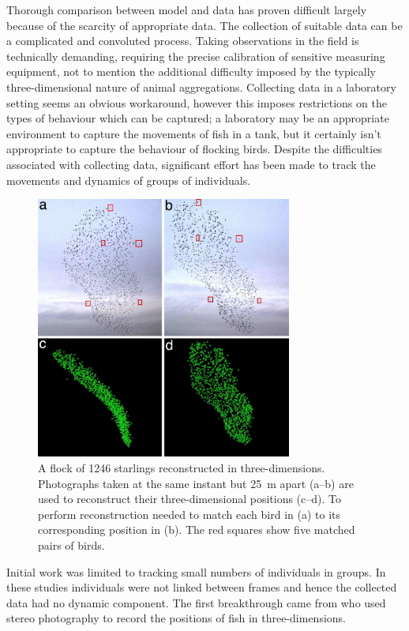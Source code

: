 Thorough comparison between model and data has proven difficult largely
because of the scarcity of appropriate data. The collection of suitable data
can be a complicated and convoluted process. Taking observations in the field
is technically demanding, requiring the precise calibration of sensitive
measuring equipment, not to mention the additional difficulty imposed by the
typically three-dimensional nature of animal aggregations. Collecting data in a
laboratory setting seems an obvious workaround, however this imposes
restrictions on the types of behaviour which can be captured; a laboratory may
be an appropriate environment to capture the movements of fish in a tank, but
it certainly isn't appropriate to capture the behaviour of flocking birds.
Despite the difficulties associated with collecting data, significant effort
has been made to track the movements and dynamics of groups of individuals.

\begin{figure}[tb]
  \includegraphics[width=0.75\textwidth]{ballerini_starlings.jpg}
  \caption{A flock of 1246 starlings reconstructed in three-dimensions.
    Photographs taken at the same instant but \SI{25}{\meter} apart (a--b) are used
    to reconstruct their three-dimensional positions (c--d). To perform
    reconstruction \textcite{ballerini08} needed to match each bird in (a)
    to its corresponding position in (b). The red squares show five matched
    pairs of birds.}
  \label{fig:ballerini}
\end{figure}

Initial work was limited to tracking small numbers of individuals in groups. In
these studies individuals were not linked between frames and hence the
collected data had no dynamic component. The first breakthrough came from
\textcite{cullen65} who used stereo photography to record the positions of fish
in three-dimensions.

